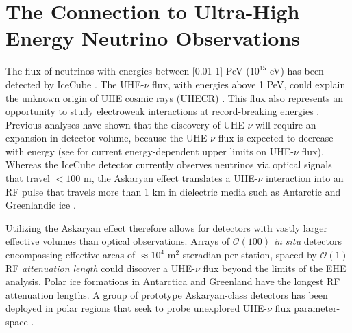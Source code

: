 \documentclass[10pt]{amsart}
\theoremstyle{definition}
\numberwithin{equation}{section}
\begin{document}
\section{The Connection to Ultra-High Energy Neutrino Observations}
\label{sec:askaryan}

The flux of neutrinos with energies between [0.01-1] PeV ($10^{15}$ eV) has been detected by IceCube \cite{10.1126/science.1242856}.  The UHE-$\nu$ flux, with energies above 1 PeV, could explain the unknown origin of UHE cosmic rays (UHECR) \cite{Ackermann:201946d}.  This flux also represents an opportunity to study electroweak interactions at record-breaking energies \cite{Ackermann:20195ec}.  Previous analyses have shown that the discovery of UHE-$\nu$ will require an expansion in detector volume, because the UHE-$\nu$ flux is expected to decrease with energy (see \cite{10.1103/physrevd.99.122001,10.1088/1475-7516/2020/03/053,10.1103/physrevd.98.062003} for current energy-dependent upper limits on UHE-$\nu$ flux).  Whereas the IceCube detector currently observes neutrinos via optical signals that travel $<100$ m, the Askaryan effect translates a UHE-$\nu$ interaction into an RF pulse that travels more than 1 km in dielectric media such as Antarctic and Greenlandic ice \cite{askaryan1,zhs,10.3189/2015jog14j214, 10.3189/2015jog15j057, 10.1016/j.astropartphys.2011.11.010}. 

Utilizing the Askaryan effect therefore allows for detectors with vastly larger effective volumes than optical observations.  Arrays of $\mathcal{O}(100)$ \textit{in situ} detectors encompassing effective areas of $\approx 10^4$ m$^2$ steradian per station, spaced by $\mathcal{O}(1)$ RF \textit{attenuation length} could discover a UHE-$\nu$ flux beyond the limits of the EHE analysis.  Polar ice formations in Antarctica and Greenland have the longest RF attenuation lengths.  A group of prototype Askaryan-class detectors has been deployed in polar regions that seek to probe unexplored UHE-$\nu$ flux parameter-space \cite{rice,10.1088/1475-7516/2020/03/053,10.1103/physrevd.102.043021,10.1103/physrevd.99.122001}. 
\end{document}
